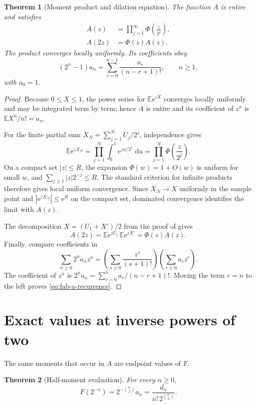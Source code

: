 \documentclass[11pt,oneside,openany]{book}
\newtheorem{theorem}{Theorem}[chapter]
\theoremstyle{definition}
\theoremstyle{remark}
\newcommand{\e}{\mathrm e}
\newcommand{\dd}{\,\mathrm d}
\begin{document}
\begin{theorem}[Moment product and dilation equation]\label{thm:fab-moment-product}
The function $A$ is entire and satisfies
\begin{align}
 A(z)&=\prod_{j=1}^{\infty}\Phi\!\left(\frac z{2^j}\right),\label{eq:fab-A-product}\\
 A(2z)&=\Phi(z)A(z).\label{eq:fab-A-refinement}
\end{align}
The product converges locally uniformly.  Its coefficients obey
\begin{equation}
 (2^n-1)a_n=\sum_{r=0}^{n-1}\frac{a_r}{(n-r+1)!},
 \qquad n\ge1,
 \label{eq:fab-a-recurrence}
\end{equation}
with $a_0=1$.
\end{theorem}

\begin{proof}
Because $0\le X\le1$, the power series for $\mathbb E\e^{zX}$ converges locally uniformly and may be integrated term by term; hence $A$ is entire and its coefficient of $z^n$ is $\mathbb E X^n/n!=a_n$.

For the finite partial sum $X_N=\sum_{j=1}^NU_j/2^j$, independence gives
\[
 \mathbb E\e^{zX_N}
 =\prod_{j=1}^N\int_0^1\e^{zu/2^j}\,\dd u
 =\prod_{j=1}^N\Phi\!\left(\frac z{2^j}\right).
\]
On a compact set $|z|\le R$, the expansion $\Phi(w)=1+O(w)$ is uniform for small $w$, and
\(
 \sum_{j\ge1}|z|2^{-j}\le R.
\)
The standard criterion for infinite products therefore gives local uniform convergence.  Since $X_N\to X$ uniformly in the sample point and $|\e^{zX_N}|\le\e^R$ on the compact set, dominated convergence identifies the limit with $A(z)$.

The decomposition $X=(U_1+X')/2$ from the proof of  gives
\[
 A(2z)=\mathbb E\e^{zU_1}\,\mathbb E\e^{zX'}=\Phi(z)A(z).
\]
Finally, compare coefficients in
\[
 \sum_{n\ge0}2^na_nz^n
 =\left(\sum_{s\ge0}\frac{z^s}{(s+1)!}\right)
  \left(\sum_{r\ge0}a_rz^r\right).
\]
The coefficient of $z^n$ is
\(
 2^na_n=\sum_{r=0}^na_r/(n-r+1)!
\).
Moving the term $r=n$ to the left proves \eqref{eq:fab-a-recurrence}.
\end{proof}

\section{Exact values at inverse powers of two}

The same moments that occur in $A$ are endpoint values of $F$.

\begin{theorem}[Half-moment evaluation]\label{thm:fab-half-moment}
For every $n\ge0$,
\begin{equation}
 F(2^{-n})=2^{-\binom n2}a_n
 =\frac{d_n}{n!\,2^{\binom n2}}.
 \label{eq:fab-half-moment}
\end{equation}
\end{theorem}
\end{document}
